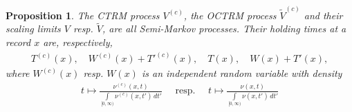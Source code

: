 \documentclass[12pt, a4paper]{article}
\newtheorem{proposition}[equation]{Proposition}
\newcommand{\1}{\mathbf 1}
\begin{document}
\begin{proposition} \label{prop:semi-markov}
  The CTRM process $V^{(c)}$, the OCTRM process $\tilde V^{(c)}$ and their 
  scaling limits $V$ resp. $\tilde V$, are all Semi-Markov processes. 
  Their holding times at a record $x$ are, respectively, 
  \begin{align}
    T^{(c)}(x), \quad W^{(c)}(x) + T'^{(c)}(x), \quad T(x), \quad W(x) + T'(x),
  \end{align}
  where $W^{(c)}(x)$ resp. $W(x)$ is an independent random variable with density 
  \begin{align} \label{eq:conditional-W}
    t \mapsto \frac{\nu^{(c)}(x,t)}{\int \limits_{[0,\infty)} \nu^{(c)}(x,t')\,dt'}
    \quad \text{ resp. } \quad 
    t \mapsto \frac{\nu(x,t)}{\int \limits_{[0,\infty)} \nu(x,t')\,dt'}
  \end{align}
\end{proposition}
\end{document}
